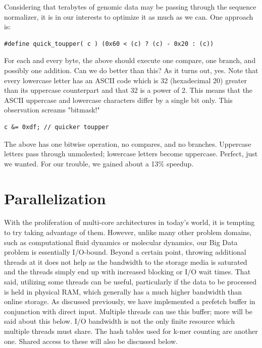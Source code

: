 \documentclass{article}
\begin{document}
Considering that terabytes of genomic data may be passing through the sequence normalizer, it is in our interests to optimize it as much as we can. One approach is:

\begin{verbatim}
#define quick_toupper( c ) (0x60 < (c) ? (c) - 0x20 : (c))
\end{verbatim}

For each and every byte, the above should execute one compare, one branch, and possibly one addition. Can we do better than this? As it turns out, yes. Note that every lowercase letter has an ASCII code which is 32 (hexadecimal 20) greater than its uppercase counterpart and that 32 is a power of 2. This means that the ASCII uppercase and lowercase characters differ by a single bit only. This observation screams "bitmask!"

\begin{verbatim}
c &= 0xdf; // quicker toupper
\end{verbatim}

The above has one bitwise operation, no compares, and no branches. Uppercase letters pass through unmolested; lowercase letters become uppercase. Perfect, just we wanted. For our trouble, we gained about a 13\% speedup.


\section{Parallelization}

With the proliferation of multi-core architectures in today's world, it is tempting to try taking advantage of them. However, unlike many other problem domains, such as computational fluid dynamics or molecular dynamics, our Big Data problem is essentially I/O-bound. Beyond a certain point, throwing additional threads at it does not help as the bandwidth to the storage media is saturated and the threads simply end up with increased blocking or I/O wait times. That said, utilizing some threads can be useful, particularly if the data to be processed is held in physical RAM, which generally has a much higher bandwidth than online storage. As discussed previously, we have implemented a prefetch buffer in conjunction with direct input. Multiple threads can use this buffer; more will be said about this below. I/O bandwidth is not the only finite resource which multiple threads must share. The hash tables used for k-mer counting are another one. Shared access to these will also be discussed below.
\end{document}
